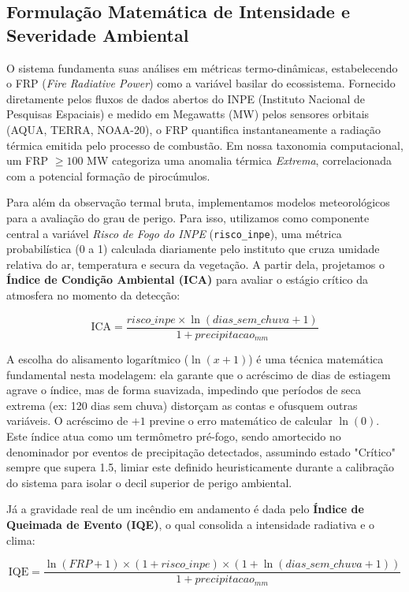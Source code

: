 \subsection{Formulação Matemática de Intensidade e Severidade Ambiental}

O sistema fundamenta suas análises em métricas termo-dinâmicas, estabelecendo o FRP (\textit{Fire Radiative Power}) como a variável basilar do ecossistema. Fornecido diretamente pelos fluxos de dados abertos do INPE (Instituto Nacional de Pesquisas Espaciais) e medido em Megawatts (MW) pelos sensores orbitais (AQUA, TERRA, NOAA-20), o FRP quantifica instantaneamente a radiação térmica emitida pelo processo de combustão. Em nossa taxonomia computacional, um FRP $\geq 100$ MW categoriza uma anomalia térmica \textit{Extrema}, correlacionada com a potencial formação de pirocúmulos.

Para além da observação termal bruta, implementamos modelos meteorológicos para a avaliação do grau de perigo. Para isso, utilizamos como componente central a variável \textit{Risco de Fogo do INPE} (\texttt{risco\_inpe}), uma métrica probabilística (0 a 1) calculada diariamente pelo instituto que cruza umidade relativa do ar, temperatura e secura da vegetação. A partir dela, projetamos o \textbf{Índice de Condição Ambiental (ICA)} para avaliar o estágio crítico da atmosfera no momento da detecção:

\begin{equation}
\text{ICA} = \frac{risco\_inpe \times \ln(dias\_sem\_chuva + 1)}{1 + precipitacao_{mm}}
\end{equation}

A escolha do alisamento logarítmico ($\ln(x + 1)$) é uma técnica matemática fundamental nesta modelagem: ela garante que o acréscimo de dias de estiagem agrave o índice, mas de forma suavizada, impedindo que períodos de seca extrema (ex: 120 dias sem chuva) distorçam as contas e ofusquem outras variáveis. O acréscimo de $+1$ previne o erro matemático de calcular $\ln(0)$. Este índice atua como um termômetro pré-fogo, sendo amortecido no denominador por eventos de precipitação detectados, assumindo estado "Crítico" sempre que supera 1.5, limiar este definido heuristicamente durante a calibração do sistema para isolar o decil superior de perigo ambiental.

Já a gravidade real de um incêndio em andamento é dada pelo \textbf{Índice de Queimada de Evento (IQE)}, o qual consolida a intensidade radiativa e o clima:

\begin{equation}
\text{IQE} = \frac{\ln(FRP + 1) \times (1 + risco\_inpe) \times (1 + \ln(dias\_sem\_chuva + 1))}{1 + precipitacao_{mm}}
\end{equation}

